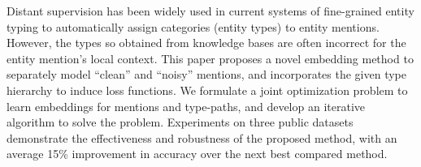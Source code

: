 Distant supervision has been widely used in current systems of fine-grained entity typing to automatically assign categories (entity types) to entity mentions. However, the types so obtained from knowledge bases are often incorrect for the entity mention's local context. This paper proposes a novel embedding method to separately model ``clean'' and ``noisy'' mentions, and incorporates the given type hierarchy to induce loss functions. We formulate a joint optimization problem to learn embeddings for mentions and type-paths, and develop an iterative algorithm to solve the problem. Experiments on three public datasets demonstrate the effectiveness and robustness of the proposed method, with an average 15\% improvement in accuracy over the next best compared method.
